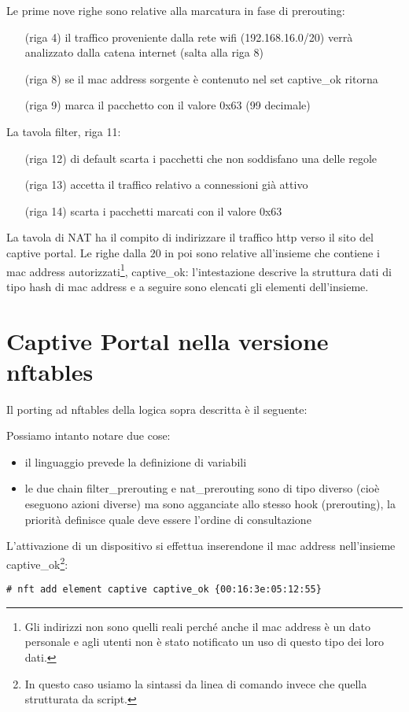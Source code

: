 Le prime nove righe sono relative alla marcatura in fase di prerouting:
\begin{itemize}[itemindent=2em]
    \item[(riga 4)] il traffico proveniente dalla rete wifi (192.168.16.0/20)
    verrà analizzato dalla catena internet (salta alla riga 8)
    \item[(riga 8)] se il mac address sorgente è contenuto nel set captive\_ok
    ritorna
    \item[(riga 9)] marca il pacchetto con il valore 0x63 (99 decimale)
  \end{itemize}
  La tavola filter, riga 11:
  \begin{itemize}[itemindent=2em]
    \item[(riga 12)] di default scarta i pacchetti che non soddisfano una delle regole
    \item[(riga 13)] accetta il traffico relativo a connessioni già attivo
    \item[(riga 14)] scarta i pacchetti marcati con il valore 0x63
\end{itemize}
La tavola di NAT ha il compito di indirizzare il traffico http verso il sito
del captive portal.
Le righe dalla $20$ in poi sono relative all'insieme che contiene i mac
address autorizzati\footnote{Gli indirizzi non sono quelli reali perché anche
il mac address è un dato personale e agli utenti non è stato notificato un uso
di questo tipo dei loro dati.}, captive\_ok:
l'intestazione descrive la struttura dati di tipo hash di mac address e a
seguire sono elencati gli elementi dell'insieme.

\section{Captive Portal nella versione nftables}
Il porting ad nftables della logica sopra descritta è il seguente:

Possiamo intanto notare due cose:
\begin{itemize}
	\item il linguaggio prevede la definizione di variabili
	
	\item le due chain filter\_prerouting e nat\_prerouting sono di tipo diverso
	(cioè eseguono azioni diverse) ma sono agganciate allo stesso hook (prerouting),
	la priorità definisce quale deve essere l'ordine di consultazione
\end{itemize}
L'attivazione di un dispositivo si effettua inserendone il mac address nell'insieme
captive\_ok\footnote{In questo caso usiamo la sintassi da linea di comando invece che quella strutturata da script.}:
\begin{lstlisting}
# nft add element captive captive_ok {00:16:3e:05:12:55}
\end{lstlisting}

